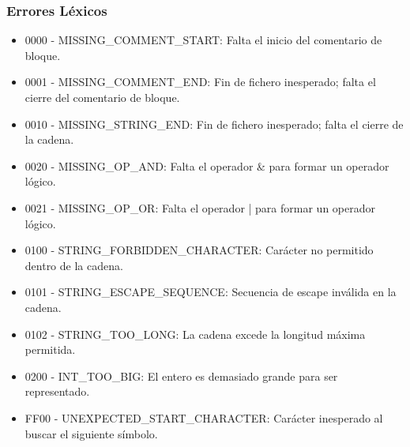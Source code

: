 \subsubsection*{Errores Léxicos}
\begin{itemize}
    \item 0000 - MISSING\_COMMENT\_START: Falta el inicio del comentario de bloque.
    \item 0001 - MISSING\_COMMENT\_END: Fin de fichero inesperado; falta el cierre del comentario de bloque.
    \item 0010 - MISSING\_STRING\_END: Fin de fichero inesperado; falta el cierre de la cadena.
    \item 0020 - MISSING\_OP\_AND: Falta el operador \& para formar un operador lógico.
    \item 0021 - MISSING\_OP\_OR: Falta el operador | para formar un operador lógico.
    \item 0100 - STRING\_FORBIDDEN\_CHARACTER: Carácter no permitido dentro de la cadena.
    \item 0101 - STRING\_ESCAPE\_SEQUENCE: Secuencia de escape inválida en la cadena.
    \item 0102 - STRING\_TOO\_LONG: La cadena excede la longitud máxima permitida.
    \item 0200 - INT\_TOO\_BIG: El entero es demasiado grande para ser representado.
    \item FF00 - UNEXPECTED\_START\_CHARACTER: Carácter inesperado al buscar el siguiente símbolo.
\end{itemize}
